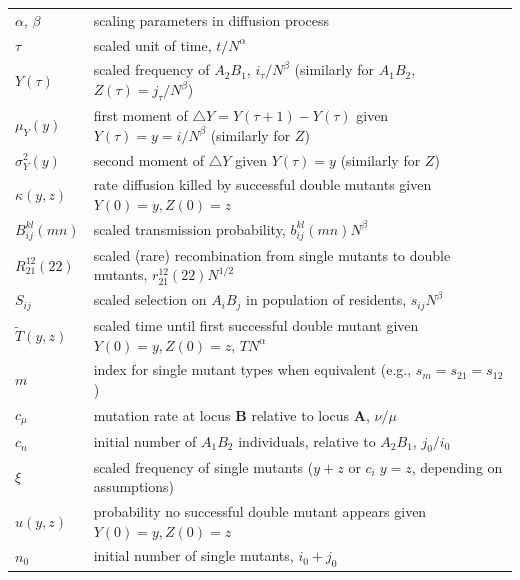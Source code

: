 \documentclass[review,3p,authoryear]{elsarticle}
\begin{document}
\begin{table}[t]
\begin{tabular}{ll}
$\alpha$, $\beta$ & scaling parameters in diffusion process\\
$\tau$ & scaled unit of time, $t/N^\alpha$ \\
$Y(\tau)$ & scaled frequency of $A_2B_1$, $i_\tau/N^\beta$ (similarly for $A_1B_2$, $Z(\tau)=j_\tau/N^\beta$) \\
$\mu_Y(y)$ & first moment of $\triangle Y = Y(\tau+1) - Y(\tau)$ given $Y(\tau) = y = i/N^\beta$ (similarly for $Z$)\\
$\sigma_Y^2(y)$ & second moment of $\triangle Y$ given $Y(\tau) = y$ (similarly for $Z$) \\
$\kappa (y,z)$ & rate diffusion killed by successful double mutants given $Y(0)=y, Z(0)=z$\\
$B_{ij}^{kl}(mn)$ & scaled transmission probability, $b_{ij}^{kl}(mn)N^\beta$ \\
$R_{21}^{12}(22)$ & scaled (rare) recombination from single mutants to double mutants, $r_{21}^{12}(22)N^{1/2}$\\
$S_{ij}$ & scaled selection on $A_iB_j$ in population of residents,  $s_{ij}N^\beta$\\
$\tilde{T}(y,z)$ & scaled time until first successful double mutant given $Y(0)=y, Z(0)=z$, $TN^\alpha$ \\
$m$ & index for single mutant types when equivalent (e.g., $s_m=s_{21}=s_{12}$) \\
$c_\mu$ & mutation rate at locus $\mathbf{B}$ relative to locus $\mathbf{A}$, $\nu/\mu$\\
$c_n$ & initial number of $A_1B_2$ individuals, relative to $A_2B_1$, $j_0/i_0$ \\
$\xi$ & scaled frequency of single mutants ($y+z$ or $c_i \; y=z$, depending on assumptions) \\
$u(y,z)$ & probability no successful double mutant appears given $Y(0)=y, Z(0)=z$ \\
$n_0$ & initial number of single mutants, $i_0+j_0$ \\
\hline
\end{tabular}
\end{table}
\end{document}
